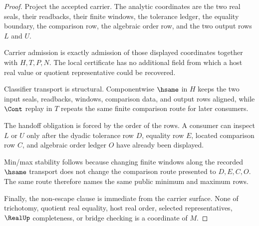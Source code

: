\begin{proof}
Project the accepted carrier. The analytic coordinates are the two real seals, their readbacks, their finite windows, the tolerance ledger, the equality boundary, the comparison row, the algebraic order row, and the two output rows $L$ and $U$.

Carrier admission is exactly admission of those displayed coordinates together with $H,T,P,N$. The local certificate has no additional field from which a host real value or quotient representative could be recovered.

Classifier transport is structural. Componentwise $\hsame$ in $H$ keeps the two input seals, readbacks, windows, comparison data, and output rows aligned, while $\Cont$ replay in $T$ repeats the same finite comparison route for later consumers.

The handoff obligation is forced by the order of the rows. A consumer can inspect $L$ or $U$ only after the dyadic tolerance row $D$, equality row $E$, located comparison row $C$, and algebraic order ledger $O$ have already been displayed.

Min/max stability follows because changing finite windows along the recorded $\hsame$ transport does not change the comparison route presented to $D,E,C,O$. The same route therefore names the same public minimum and maximum rows.

Finally, the non-escape clause is immediate from the carrier surface. None of trichotomy, quotient real equality, host real order, selected representatives, $\RealUp$ completeness, or bridge checking is a coordinate of $M$.
\end{proof}

